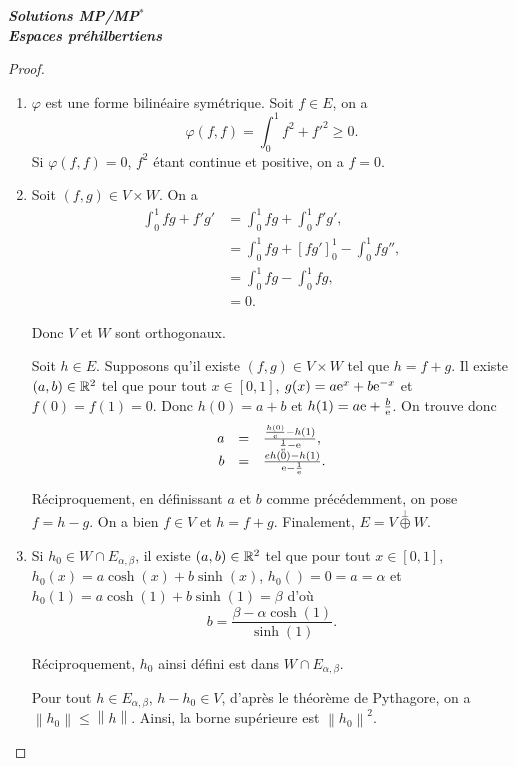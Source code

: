 \documentclass[12pt]{article}
\begin{document}
\begin{titlepage}
	\centering
	\vspace*{\fill}
	\Huge \textit{\textbf{Solutions MP/MP$^*$\\ Espaces préhilbertiens}}
	\vspace*{\fill}
\end{titlepage}

\begin{proof}
	\phantom{}
	\begin{enumerate}
		\item $\varphi$ est une forme bilinéaire symétrique. Soit $f\in E$, on a 
		\begin{equation}
			\varphi(f,f)=\int_{0}^{1}f^{2}+f'^{2}\geqslant 0.
		\end{equation}
		Si $\varphi(f,f)=0$, $f^{2}$ étant continue et positive, on a $f=0$. 

		\item Soit $(f,g)\in V\times W$. On a 
		\begin{align}
			\int_{0}^{1}fg +f'g'
			&=\int_{0}^{1}fg+\int_{0}^{1}f'g',\\
			&=\int_{0}^{1}fg+[fg']_{0}^{1}-\int_{0}^{1}fg'',\\
			&=\int_{0}^{1}fg-\int_{0}^{1}fg,\\
			&=0.
		\end{align}

		Donc $V$ et $W$ sont orthogonaux.

		Soit $h\in E$. Supposons qu'il existe $(f,g)\in V\times W$ tel que $h=f+g$. Il existe $(a,b)\in\mathbb{R}^{2}$ tel que pour tout $x\in[0,1]$, $g(x)=a\mathrm{e}^{x}+b\mathrm{e}^{-x}$ et $f(0)=f(1)=0$. Donc $h(0)=a+b$ et $h(1)=a\mathrm{e}+\frac{b}{\mathrm{e}}$. On trouve donc 
		\begin{equation}
			\begin{array}[]{rcl}
				a &=& \frac{\frac{h(0)}{\e}-h(1)}{\frac{1}{\e}-\e},\\
				b &=& \frac{eh(0)-h(1)}{\e-\frac{1}{\e}}.
			\end{array}
		\end{equation}

		Réciproquement, en définissant $a$ et $b$ comme précédemment, on pose $f=h-g$. On a bien $f\in V$ et $h=f+g$. Finalement, $E= V\overset{\perp}{\oplus} W$.

		\item Si $h_0\in W\cap E_{\alpha,\beta}$, il existe $(a,b)\in\mathbb{R}^{2}$ tel que pour tout $x\in[0,1]$, $h_0(x)=a\cosh(x)+b\sinh(x)$, $h_0()=0=a=\alpha$ et $h_0(1)=a\cosh(1)+b\sinh(1)=\beta$ d'où 
		\begin{equation}
			b=\frac{\beta-\alpha\cosh(1)}{\sinh(1)}.
		\end{equation}

		Réciproquement, $h_0$ ainsi défini est dans $W\cap E_{\alpha,\beta}$.

		Pour tout $h\in E_{\alpha,\beta}$, $h-h_{0}\in V$, d'après le théorème de Pythagore, on a $\left\lVert h_0\right\rVert\leqslant\left\lVert h\right\rVert$. Ainsi, la borne supérieure est $\left\lVert h_0\right\rVert^{2}$.
	\end{enumerate}
\end{proof}
\end{document}
